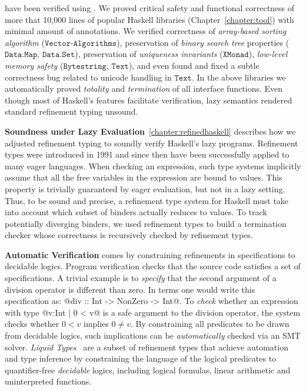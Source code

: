  have been verified using 
\toolname. 
%
We proved critical safety and functional correctness of 
more that 10,000 lines of popular Haskell libraries (Chapter~\ref{chapter:tool})
with minimal amount of annotations.
%
We verified correctness of \textit{array-based sorting algorithm} ($\texttt{Vector-Algorithms}$),
preservation of \textit{binary search tree} properties ($\texttt{Data.Map}$, $\texttt{Data.Set}$),
preservation of \textit{uniqueness invariants} ($\texttt{XMonad}$), 
\textit{low-level memory safety} ($\texttt{Bytestring}$, $\texttt{Text}$), 
and even found and fixed a subtle correctness bug related to unicode handling in $\texttt{Text}$.
%
In the above libraries we automatically 
proved \textit{totality} and \textit{termination} of 
all interface functions. 
%
Even though most of Haskell's features facilitate verification, 
lazy semantics rendered standard refinement typing unsound. 

\textbf{Soundness under Lazy Evaluation}~\ref{chapter:refinedhaskell} describes
how we adjusted refinement typing to soundly 
verify Haskell's lazy programs. 
% 
Refinement types were introduced in 1991 %
and since then have been successfully applied to many eager languages.
%
When checking an expression, such type systems
implicitly assume that all the free variables in the expression are
bound to values. 
%
This property is trivially guaranteed by eager evaluation, but 
not in a lazy setting.
% 
Thus, to be sound and precise,
a refinement type system for Haskell 
must take into account which subset of binders
actually reduces to values. 
%
To track potentially diverging binders, 
we used refinement types to build a termination checker 
whose correctness is recursively checked by refinement types.
%


\textbf{Automatic Verification} comes by constraining refinements in specifications 
to decidable logics. 
Program verification checks that the source code satisfies 
a set of specifications. 
%
A trivial example is to \textit{specify} that the second argument of a division operator 
is different than zero.
%
In \toolname terms one would write this specification as:
@div :: Int -> NonZero -> Int@.
To \textit{check} whether an expression with type 
@{v:Int | 0 < v}@
is a safe argument to the division operator, the system checks 
whether $ 0 < v $ implies $0 \neq v$. 
%
By constraining all predicates to be drawn from decidable logics, 
such implications can be \textit{automatically} checked via an SMT solver.
%
\textit{Liquid Types}~\cite{LiquidPLDI09} are a subset of refinement types 
that achieve automation and type inference by 
constraining the language of the logical predicates to quantifier-free \textit{decidable} logics, including 
logical formulas, linear arithmetic and uninterpreted functions.
%


